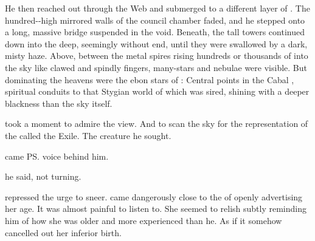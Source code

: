 \begin{garbage}
\begin{comment}
\subsection{The causeways}
\end{comment}

He then reached out through the Web and submerged to a different layer of \Nyx. 
The hundred-\metres-high mirrored walls of the council chamber faded, and he stepped onto a long, massive bridge suspended in the void. 
Beneath, the tall towers continued down into the deep, seemingly without end, until they were swallowed by a dark, misty haze. 
Above, between the metal spires rising hundreds or thousands of \metres into the sky like clawed and spindly fingers, many-\coloured stars and nebulae were visible. 
But dominating the heavens were the ebon stars of \Erebos: 
Central \nexus{} points in the Cabal \Matrix, spiritual conduits to that Stygian world of which \Nyx{} was sired, shining with a deeper blackness than the sky itself. 

\Teshrial{} took a moment to admire the view. 
And to scan the sky for the representation of the \vertex{} called the Exile. 
The creature he sought. 

 came \ps{\Achsah}{} voice behind him. 

 he said, not turning. 




\Teshrial{} repressed the urge to sneer. 
\Achsah{} came dangerously close to the \fauxpas{} of openly advertising her age. 
It was almost painful to listen to. 
She seemed to relish subtly reminding him of how she was older and more experienced than he. 
As if it somehow cancelled out her inferior birth. 


\end{garbage}

